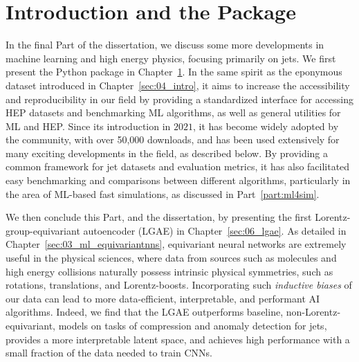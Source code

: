 

\chapter{Introduction and the \jetnet Package}
\label{sec:06_jetnet}

In the final Part of the dissertation, we discuss some more developments in machine learning and high energy physics, focusing primarily on jets.
We first present the \jetnet Python package in Chapter~\ref{sec:06_jetnet}.
In the same spirit as the eponymous dataset introduced in Chapter~\ref{sec:04_intro}, it aims to increase the accessibility and reproducibility in our field by providing a standardized interface for accessing HEP datasets and benchmarking ML algorithms, as well as general utilities for ML and HEP.
Since its introduction in $2021$, it has become widely adopted by the community, with over 50,000 downloads, and has been used extensively for many exciting developments in the field, as described below.
By providing a common framework for jet datasets and evaluation metrics, it has also facilitated easy benchmarking and comparisons between different algorithms, particularly in the area of ML-based fast simulations, as discussed in Part~\ref{part:ml4sim}.

We then conclude this Part, and the dissertation, by presenting the first Lorentz-group-equivariant autoencoder (LGAE) in Chapter~\ref{sec:06_lgae}.
As detailed in Chapter~\ref{sec:03_ml_equivariantnns}, equivariant neural networks are extremely useful in the physical sciences, where data from sources such as molecules and high energy collisions naturally possess intrinsic physical symmetries, such as rotations, translations, and Lorentz-boosts.
Incorporating such \textit{inductive biases} of our data can lead to more data-efficient, interpretable, and performant AI algorithms.
Indeed, we find that the LGAE outperforms baseline, non-Lorentz-equivariant, models on tasks of compression and anomaly detection for jets, provides a more interpretable latent space, and achieves high performance with a small fraction of the data needed to train CNNs.

